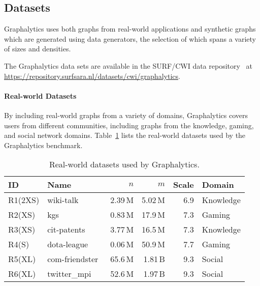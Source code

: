 \subsection{Datasets}\label{sec:definition_datasets}
Graphalytics uses both graphs from real-world applications and synthetic graphs which are generated using data generators, the selection of which spans a variety of sizes and densities.

The Graphalytics data sets are available in the SURF/CWI data repository~\cite{cwi:graphalytics} at \url{https://repository.surfsara.nl/datasets/cwi/graphalytics}.

\paragraph{Real-world Datasets} By including real-world graphs from a variety of domains, Graphalytics covers users from different communities, including graphs from the knowledge, gaming, and social network domains.  Table~\ref{tab:real-datasets} lists the real-world datasets used by the Graphalytics benchmark.

\begin{table}[h]
\caption{Real-world datasets used by Graphalytics.}
\label{tab:real-datasets}
\centering
\begin{tabular}{|l|l|r|r|r|l|}
\hline
\textbf{ID} & \textbf{Name} & \textbf{$n$} & \textbf{$m$} & \textbf{Scale} & \textbf{Domain} \\
\hline
R1(2XS) & wiki-talk~\cite{snapnets} & 2.39\,M & 5.02\,M & 6.9 & Knowledge \\
\hline
R2(XS) & kgs~\cite{DBLP:conf/netgames/GuoI12} & 0.83\,M & 17.9\,M & 7.3 & Gaming \\
\hline
R3(XS) & cit-patents~\cite{snapnets} & 3.77\,M & 16.5\,M & 7.3 & Knowledge \\
\hline
R4(S) & dota-league~\cite{DBLP:conf/netgames/GuoI12} & 0.06\,M & 50.9\,M & 7.7 & Gaming \\
\hline
R5(XL) & com-friendster~\cite{snapnets} & 65.6\,M & 1.81\,B & 9.3 & Social \\
\hline
R6(XL) & twitter\_mpi~\cite{DBLP:conf/icwsm/ChaHBG10} & 52.6\,M & 1.97\,B & 9.3 & Social \\
\hline
\end{tabular}
\end{table}





